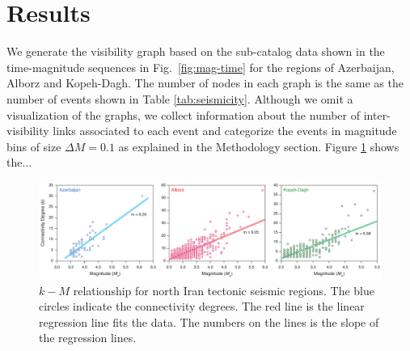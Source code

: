 
\section{Results}

We generate the visibility graph based on the sub-catalog data shown in the time-magnitude sequences in Fig.~\ref{fig:mag-time} for the regions of Azerbaijan, Alborz and Kopeh-Dagh. The number of nodes in each graph is the same as the number of events shown in Table \ref{tab:seismicity}. Although we omit a visualization of the graphs, we collect information about the number of inter-visibility links associated to each event and categorize the events in magnitude bins of size $\Delta M = 0.1$ as explained in the Methodology section. Figure \ref{fig:km} shows the...




\begin{figure}[t]
	\centering
	\includegraphics[width=\textwidth]{figures/pdf/figure-06} 
	\caption{ $k-M$ relationship for north Iran tectonic seismic regions. The blue circles indicate the connectivity degrees. The red line is the linear regression line fits the data. The numbers on the lines is the slope of the regression lines.}
	\label{fig:km}
\end{figure}


